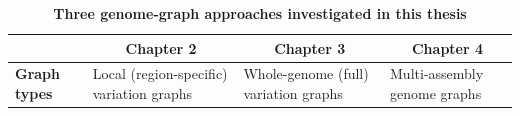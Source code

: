 \documentclass[../main.tex]{subfiles}
\begin{document}
\begin{landscape}
   \thispagestyle{noheadi}
   \begin{table}
      \centering
      \footnotesize
      \caption[Three genome-graph approaches investigated in this thesis]{\textbf{Three genome-graph approaches investigated in this thesis}}
      \vspace{1em}
      \begin{tabular}{|l|l|l|l|} 
      \cline{2-4}
      \multicolumn{1}{l|}{}                                                                               & \multicolumn{1}{c|}{\textbf{Chapter 2}}                                                                                                                                                                                                                                                                       & \multicolumn{1}{c|}{\textbf{Chapter 3}}                                                                                                                                                                                                                  & \multicolumn{1}{c|}{\textbf{Chapter 4}}                                                                                                                                                                                                                      \\ 
      \hline
      \textbf{Graph types}                                                                                & Local (region-specific) variation graphs                                                                                                                                                                                                                                                                      & Whole-genome (full) variation graphs                                                                                                                                                                                                                     & Multi-assembly genome graphs                                                                                                                                                                                                                                 \\ 
      \hline

\end{tabular}
\end{table}
\end{landscape}
\end{document}
